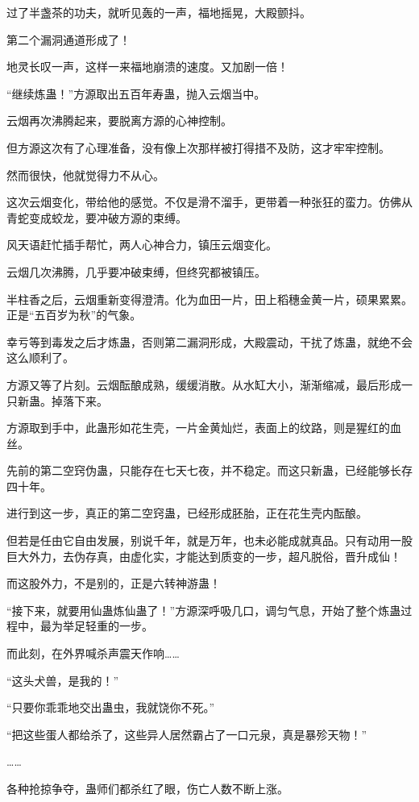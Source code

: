 \begin{this_body}
过了半盏茶的功夫，就听见轰的一声，福地摇晃，大殿颤抖。

第二个漏洞通道形成了！

地灵长叹一声，这样一来福地崩溃的速度。又加剧一倍！

“继续炼蛊！”方源取出五百年寿蛊，抛入云烟当中。

云烟再次沸腾起来，要脱离方源的心神控制。

但方源这次有了心理准备，没有像上次那样被打得措不及防，这才牢牢控制。

然而很快，他就觉得力不从心。

这次云烟变化，带给他的感觉。不仅是滑不溜手，更带着一种张狂的蛮力。仿佛从青蛇变成蛟龙，要冲破方源的束缚。

风天语赶忙插手帮忙，两人心神合力，镇压云烟变化。

云烟几次沸腾，几乎要冲破束缚，但终究都被镇压。

半柱香之后，云烟重新变得澄清。化为血田一片，田上稻穗金黄一片，硕果累累。正是“五百岁为秋”的气象。

幸亏等到毒发之后才炼蛊，否则第二漏洞形成，大殿震动，干扰了炼蛊，就绝不会这么顺利了。

方源又等了片刻。云烟酝酿成熟，缓缓消散。从水缸大小，渐渐缩减，最后形成一只新蛊。掉落下来。

方源取到手中，此蛊形如花生壳，一片金黄灿烂，表面上的纹路，则是猩红的血丝。

先前的第二空窍伪蛊，只能存在七天七夜，并不稳定。而这只新蛊，已经能够长存四十年。

进行到这一步，真正的第二空窍蛊，已经形成胚胎，正在花生壳内酝酿。

但若是任由它自由发展，别说千年，就是万年，也未必能成就真品。只有动用一股巨大外力，去伪存真，由虚化实，才能达到质变的一步，超凡脱俗，晋升成仙！

而这股外力，不是别的，正是六转神游蛊！

“接下来，就要用仙蛊炼仙蛊了！”方源深呼吸几口，调匀气息，开始了整个炼蛊过程中，最为举足轻重的一步。

而此刻，在外界喊杀声震天作响……

“这头犬兽，是我的！”

“只要你乖乖地交出蛊虫，我就饶你不死。”

“把这些蛋人都给杀了，这些异人居然霸占了一口元泉，真是暴殄天物！”

……

各种抢掠争夺，蛊师们都杀红了眼，伤亡人数不断上涨。


\end{this_body}
